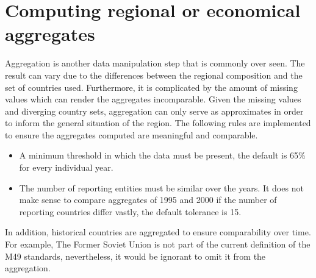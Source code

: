 \documentclass[nojss]{jss}\usepackage{graphicx, color}
\begin{document}





\section{Computing regional or economical aggregates}
Aggregation is another data manipulation step that is commonly over
seen. The result can vary due to the differences between the regional
composition and the set of countries used. Furthermore, it is
complicated by the amount of missing values which can render the
aggregates incomparable. Given the missing values and diverging
country sets, aggregation can only serve as approximates in order to
inform the general situation of the region. The following rules are
implemented to ensure the aggregates computed are meaningful and
comparable.


\begin{itemize}
  \item A minimum threshold in which the data must be present, the
    default is 65\% for every individual year.
  \item The number of reporting entities must be similar over the
    years. It does not make sense to compare aggregates of 1995 and
    2000 if the number of reporting countries differ vastly, the
    default tolerance is 15.
\end{itemize}

In addition, historical countries are aggregated to ensure
comparability over time. For example, The Former Soviet Union is not
part of the current definition of the M49 standards, nevertheless,
it would be ignorant to omit it from the aggregation.
\end{document}
